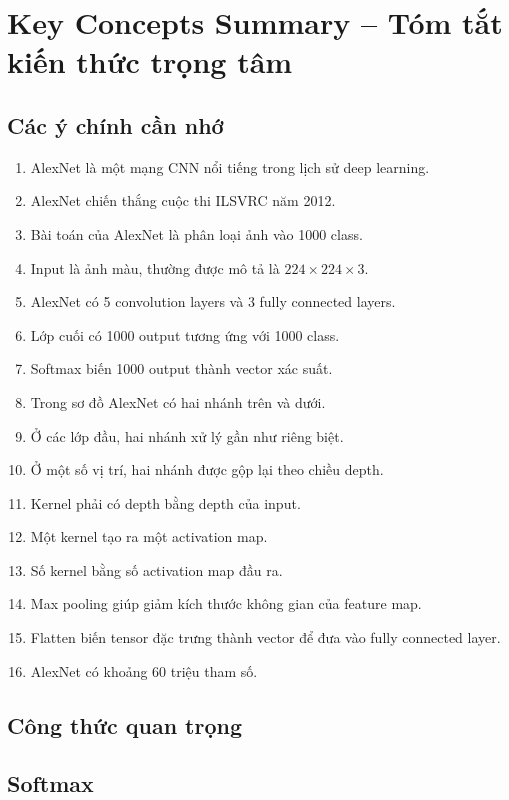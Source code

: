 \section{Key Concepts Summary -- Tóm tắt kiến thức trọng tâm}

\subsection{Các ý chính cần nhớ}

\begin{enumerate}
    \item AlexNet là một mạng CNN nổi tiếng trong lịch sử deep learning.
    \item AlexNet chiến thắng cuộc thi ILSVRC năm 2012.
    \item Bài toán của AlexNet là phân loại ảnh vào 1000 class.
    \item Input là ảnh màu, thường được mô tả là $224\times224\times3$.
    \item AlexNet có 5 convolution layers và 3 fully connected layers.
    \item Lớp cuối có 1000 output tương ứng với 1000 class.
    \item Softmax biến 1000 output thành vector xác suất.
    \item Trong sơ đồ AlexNet có hai nhánh trên và dưới.
    \item Ở các lớp đầu, hai nhánh xử lý gần như riêng biệt.
    \item Ở một số vị trí, hai nhánh được gộp lại theo chiều depth.
    \item Kernel phải có depth bằng depth của input.
    \item Một kernel tạo ra một activation map.
    \item Số kernel bằng số activation map đầu ra.
    \item Max pooling giúp giảm kích thước không gian của feature map.
    \item Flatten biến tensor đặc trưng thành vector để đưa vào fully connected layer.
    \item AlexNet có khoảng 60 triệu tham số.
\end{enumerate}

\subsection{Công thức quan trọng}

\subsection*{Softmax}

